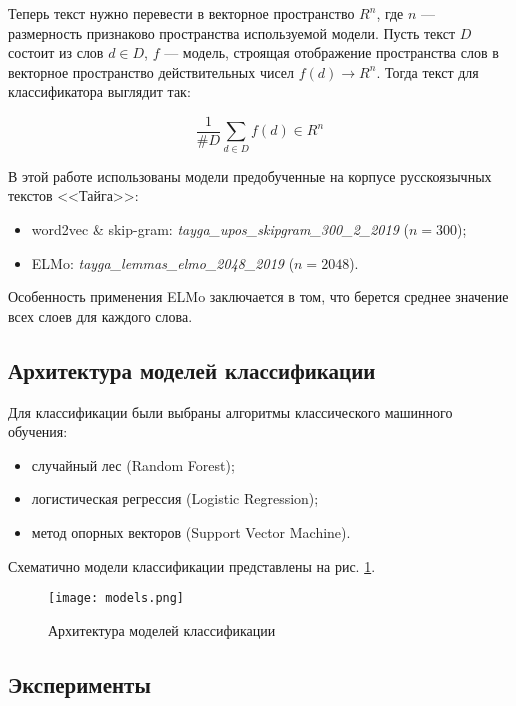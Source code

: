 Теперь текст нужно перевести в векторное пространство $R^n$, где $n$ --- размерность признаково пространства используемой модели. Пусть текст $D$ состоит из слов $d \in D$, $f$ --- модель, строящая отображение пространства слов в векторное пространство действительных чисел $f(d) \to R^n$. Тогда текст для классификатора выглядит так:

\begin{equation*}
 \frac{1}{\#D}\sum_{d \in D} f(d) \in R^n
\end{equation*}

В этой работе использованы модели предобученные на корпусе русскоязычных текстов <<Тайга>>:

\bigskip
\begin{itemize}
 \item word2vec \& skip-gram: \textit{tayga\_upos\_skipgram\_300\_2\_2019} ($n = 300$);
 \item ELMo: \textit{tayga\_lemmas\_elmo\_2048\_2019} ($n = 2048$).
\end{itemize}

\bigskip
Особенность применения ELMo заключается в том, что берется среднее значение всех слоев для каждого слова.

\subsection{Архитектура моделей классификации}

Для классификации были выбраны алгоритмы классического машинного обучения:

\bigskip
\begin{itemize}
 \item случайный лес (Random Forest);
 \item логистическая регрессия (Logistic Regression);
 \item метод опорных векторов (Support Vector Machine).
\end{itemize}

\bigskip\noindent
Схематично модели классификации представлены на рис. \ref{fig:models}.

\begin{figure}[ht]
    \centering
    \texttt{[image: models.png]}
    \caption{Архитектура моделей классификации}
    \label{fig:models}
\end{figure}


\subsection{Эксперименты}

